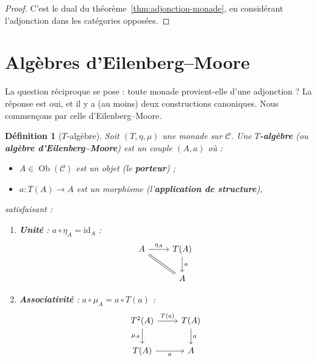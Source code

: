\documentclass[a4paper,12pt]{book}
\DeclareMathOperator{\Ob}{Ob}
\newcommand{\id}{\mathrm{id}}
\newtheorem{definition}[theoreme]{Définition}
\begin{document}
\begin{proof}
C'est le dual du théorème~\ref{thm:adjonction-monade}, en considérant
l'adjonction dans les catégories opposées.
\end{proof}


\section{Algèbres d'Eilenberg--Moore}\label{sec:eilenberg-moore}

La question réciproque se pose : toute monade provient-elle d'une adjonction ?
La réponse est oui, et il y a (au moins) deux constructions canoniques.
Nous commençons par celle d'Eilenberg--Moore.

\begin{definition}[$T$-algèbre]\label{def:T-algebre}
Soit $(T, \eta, \mu)$ une monade sur $\mathcal{C}$.
Une \textbf{$T$-algèbre} (ou \textbf{algèbre d'Eilenberg--Moore})
est un couple $(A, a)$ où :
\begin{itemize}
    \item $A \in \Ob(\mathcal{C})$ est un objet (le \textbf{porteur}) ;
    \item $a \colon T(A) \to A$ est un morphisme
    (l'\textbf{application de structure}),
\end{itemize}
satisfaisant :
\begin{enumerate}[label=(\roman*)]
\item \textbf{Unité} :
    $a \circ \eta_A = \id_A$ :
\[
\begin{tikzcd}
A \arrow[r, "\eta_A"] \arrow[dr, equal] & T(A) \arrow[d, "a"] \\
& A
\end{tikzcd}
\]

\item \textbf{Associativité} :
    $a \circ \mu_A = a \circ T(a)$ :
\[
\begin{tikzcd}
T^2(A) \arrow[r, "T(a)"] \arrow[d, "\mu_A"'] & T(A) \arrow[d, "a"] \\
T(A) \arrow[r, "a"'] & A
\end{tikzcd}
\]
\end{enumerate}
\end{definition}
\end{document}
